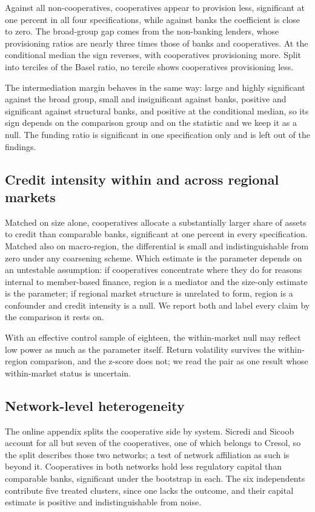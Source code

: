 \documentclass[11pt,a4paper]{article}
\begin{document}
Against all non-cooperatives, cooperatives appear to provision less, significant at one
percent in all four specifications, while against banks the coefficient is close to zero.
The broad-group gap comes from the non-banking lenders, whose provisioning ratios are
nearly three times those of banks and cooperatives. At the
conditional median the sign reverses, with cooperatives provisioning more.
Split into terciles of the Basel ratio, no tercile shows cooperatives provisioning
less.

The intermediation margin behaves in the same way: large and highly significant against
the broad group, small and insignificant against banks, positive and significant
against structural banks, and positive at the conditional median, so its sign depends
on the comparison group and on the statistic and we keep it as a null. The funding ratio is significant in one specification only and is left out of
the findings.

\subsection{Credit intensity within and across regional markets}
\label{sec:region}

Matched on size alone, cooperatives allocate a substantially larger share of assets to
credit than comparable banks, significant at one percent in every specification. Matched
also on macro-region, the differential is small and indistinguishable from zero under
any coarsening scheme. Which estimate is the parameter depends on an untestable assumption: if cooperatives
concentrate where they do for reasons internal to member-based finance, region is a
mediator and the size-only estimate is the parameter; if regional market structure is
unrelated to form, region is a confounder and credit intensity is a null. We report
both and label every claim by the comparison it rests on.

With an effective control sample of eighteen, the within-market
null may reflect low power as much as the parameter itself. Return volatility survives the within-region comparison, and the z-score does not; we read the pair as one result whose within-market status is
uncertain.

\subsection{Network-level heterogeneity}

The online appendix splits the cooperative side by system. Sicredi and Sicoob account
for all but seven of the cooperatives, one of which belongs to Cresol, so the split
describes those two networks; a test of network affiliation as such is beyond it.
Cooperatives in both networks hold less regulatory capital than comparable banks,
significant under the bootstrap in each. The six independents contribute five treated
clusters, since one lacks the outcome, and their capital estimate is positive and
indistinguishable from noise.
\end{document}
